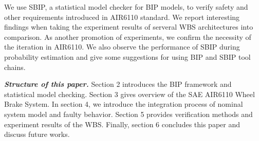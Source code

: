We use SBIP\cite{atva18}, a statistical model checker for BIP models, to verify safety and other requirements introduced in AIR6110 standard. We report interesting findings when taking the experiment results of serveral WBS architectures into comparison. As another promotion of experiments, we confirm the necessity of the iteration in AIR6110. We also observe the performance of SBIP during probability estimation and give some suggestions for using BIP and SBIP tool chains.

\textbf{\emph{Structure of this paper.}} Section 2 introduces the BIP framework and statistical model checking. Section 3 gives overview of the SAE AIR6110 Wheel Brake System. In section 4, we introduce the integration process of nominal system model and faulty behavior. Section 5 provides verification methods and experiment results of the WBS. Finally, section 6 concludes this paper and discuss future works.